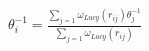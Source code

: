 \pagestyle{empty}


\begin{eqnarray*}
   \theta_i^{-1} = \frac{\sum_{j=1}\omega_{Lucy}\left(r_{ij}\right)\theta_j^{-1}}{\sum_{j=1}\omega_{Lucy}\left(r_{ij}\right)}
\end{eqnarray*}                           


